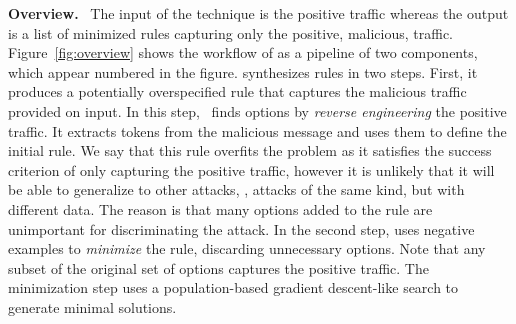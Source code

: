 \documentclass[runningheads]{llncs}
\begin{document}
\vspace{1ex}
\noindent\textbf{Overview.}~ The input of the technique is the
positive traffic whereas the output is a list of minimized rules
capturing only the positive, malicious,
traffic. Figure~\ref{fig:overview} shows the workflow of \tname{} as a
pipeline of two components, which appear numbered in the figure.
\tname{} synthesizes rules in two steps. First, it produces a
potentially overspecified rule that captures the malicious traffic
provided on input. In this step, \tname\ finds options by
\emph{reverse engineering} the positive traffic. It extracts tokens
from the malicious message and uses them to define the initial
rule. We say that this rule overfits the problem as it satisfies the
success criterion of only capturing the positive traffic, however it
is unlikely that it will be able to generalize to other attacks,
\ie{}, attacks of the same kind, but with different data. The reason
is that many options added to the rule are unimportant for
discriminating the attack. In the second step, \tname{} uses negative
examples to \emph{minimize} the rule, discarding unnecessary
options. Note that any subset of the original set of options captures
the positive traffic. The minimization step uses a population-based
gradient descent-like search to generate minimal solutions.





\end{document}
